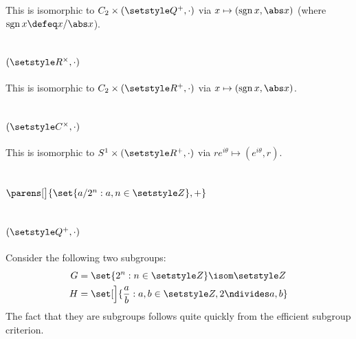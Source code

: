 \documentclass[fleqn,a4paper,11pt]{article}
\begin{document}
This is isomorphic to \(C_2 \times (\Rationals^+, \cdot)\) via
\(x \mapsto (\sgn x, \abs x)\) (where \(\sgn x \defeq x/\abs x\)).

\section{\((\Reals^\times, \cdot)\)}

This is isomorphic to \(C_2 \times (\Reals^+, \cdot)\) via
\(x \mapsto (\sgn x, \abs x)\).

\section{\((\Complex^\times, \cdot)\)}

This is isomorphic to \(S^1 \times (\Reals^+, \cdot)\) via
\(re^{i\theta} \mapsto (e^{i\theta}, r)\).

\section{\(\parens[\big]{\set{a / 2^n : a, n \in \Integers}, +}\)}

\section{\((\Rationals^+, \cdot)\)}

Consider the following two subgroups:
\begin{align*}
 G &= \set{2^n : n \in \Integers} \isom \Integers \\
 H &= \set[\Big]{\frac ab : a, b \in \Integers, 2 \ndivides a, b}
\end{align*}
The fact that they are subgroups follows quite quickly from the efficient
subgroup criterion.
\end{document}
